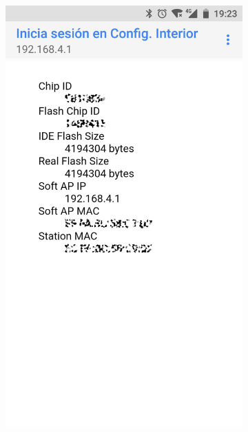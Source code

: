 \begin{figure}
\begin{subfigure}{0.49\columnwidth}
  \centering
  \includegraphics[width=1\columnwidth,frame]{images/interior-info}
  \caption{}
  \label{fig:interior-info}
\end{subfigure}
\hfill
\begin{subfigure}{0.49\columnwidth}
  \centering

\end{subfigure}
\end{figure}
